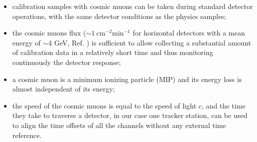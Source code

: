 \begin{itemize}
    \item calibration samples with cosmic muons 
    can be taken during standard detector operations, 
    with the same detector conditions as the physics samples;
    \item the cosmic muons flux 
    ($\sim 1 \ \text{cm}^{-2} \text{min}^{-1}$ 
    for horizontal detectors with a mean
    energy of $\sim$4 GeV, Ref. \cite{muonflux}) 
    is sufficient to allow
    collecting a substantial amount of calibration 
    data in a relatively short time and 
    thus monitoring continuously the detector response;
    \item a cosmic muon is a minimum ionizing 
    particle (MIP) and 
    its energy loss is almost 
    independent of its energy;
    \item the speed of the cosmic muons is equal to the 
    speed of light $c$, and the time they take to traverse 
    a detector, in our case one tracker station, can be 
    used to align the time offsets of all the channels  
    without any external time reference.
\end{itemize}
